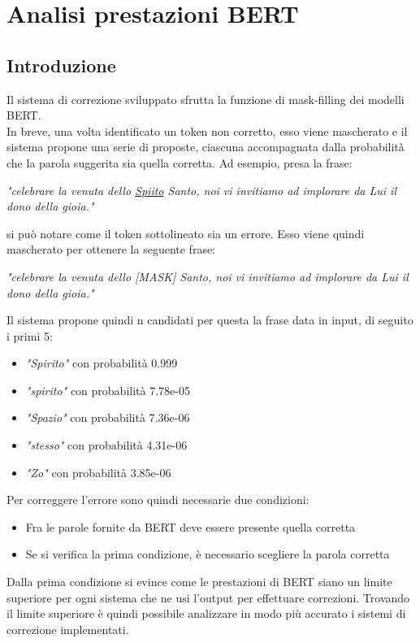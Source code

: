 \documentclass[12pt]{article}
\begin{document}
\maketitle
\newcommand{\E}{È}



\section{Analisi prestazioni BERT}
\subsection{Introduzione}
Il sistema di correzione sviluppato sfrutta la funzione di mask-filling dei modelli BERT. \\
In breve, una volta identificato un token non corretto, esso viene mascherato e il sistema propone una serie di proposte, ciascuna accompagnata dalla probabilità che la parola suggerita sia quella corretta.
Ad esempio, presa la frase:
\begin{center}
\textit{"celebrare la venuta dello \underline{Spiito} Santo, noi vi invitiamo ad implorare da Lui il dono della gioia."}
\end{center}
si può notare come il token sottolineato sia un errore. Esso viene quindi mascherato per ottenere la seguente frase:
\begin{center}
\textit{"celebrare la venuta dello [MASK] Santo, noi vi invitiamo ad implorare da Lui il dono della gioia."}
\end{center}
Il sistema propone quindi n candidati per questa la frase data in input, di seguito i primi 5:
\begin{itemize}
\item  \textit{"Spirito"} con probabilità 0.999
\item  \textit{"spirito"} con probabilità 7.78e-05
\item  \textit{"Spazio"} con probabilità 7.36e-06
\item  \textit{"stesso"} con probabilità 4.31e-06
\item  \textit{"Zo"} con probabilità 3.85e-06
\end{itemize}
Per correggere l'errore sono quindi necessarie due condizioni:
\begin{itemize}
\item Fra le parole fornite da BERT deve essere presente quella corretta
\item Se si verifica la prima condizione, è necessario scegliere la parola corretta
\end{itemize}
Dalla prima condizione si evince come le prestazioni di BERT siano un limite superiore per ogni sistema che ne usi l'output per effettuare correzioni. Trovando il limite superiore è quindi possibile analizzare in modo più accurato i sistemi di correzione implementati.
\end{document}
